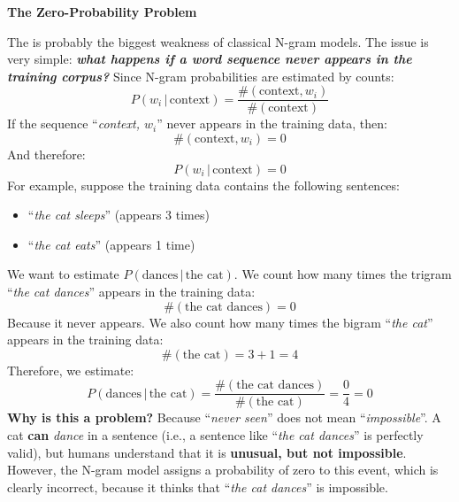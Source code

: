 \begin{flushleft}
    \textcolor{Red2}{ \textbf{The Zero-Probability Problem}}\label{def:the-zero-probability-problem}
\end{flushleft}
The  is probably the biggest weakness of classical N-gram models. The issue is very simple: \emph{\textbf{what happens if a word sequence never appears in the training corpus?}} Since N-gram probabilities are estimated by counts:
\begin{equation*}
    P\left(w_{i} \, | \, \text{context}\right) = \frac{\#\left(\text{context}, w_i\right)}{\#\left(\text{context}\right)}
\end{equation*}
If the sequence ``\emph{context, $w_i$}'' never appears in the training data, then:
\begin{equation*}
    \#\left(\text{context}, w_i\right) = 0
\end{equation*}
And therefore:
\begin{equation*}
    P\left(w_{i} \, | \, \text{context}\right) = 0
\end{equation*}
For example, suppose the training data contains the following sentences:
\begin{itemize}
    \item ``\emph{the cat sleeps}'' (appears 3 times)
    \item ``\emph{the cat eats}'' (appears 1 time)
\end{itemize}
We want to estimate $P\left(\text{dances} \, | \, \text{the cat}\right)$. We count how many times the trigram ``\emph{the cat dances}'' appears in the training data:
\begin{equation*}
    \#\left(\text{the cat dances}\right) = 0
\end{equation*}
Because it never appears. We also count how many times the bigram ``\emph{the cat}'' appears in the training data:
\begin{equation*}
    \#\left(\text{the cat}\right) = 3 + 1 = 4
\end{equation*}
Therefore, we estimate:
\begin{equation*}
    P\left(\text{dances} \, | \, \text{the cat}\right) = \frac{\#\left(\text{the cat dances}\right)}{\#\left(\text{the cat}\right)} = \frac{0}{4} = 0
\end{equation*}
\textcolor{Green3}{ \textbf{Why is this a problem?}} Because ``\emph{never seen}'' does not mean ``\emph{impossible}''. A cat \textbf{can} \emph{dance} in a sentence (i.e., a sentence like ``\emph{the cat dances}'' is perfectly valid), but humans understand that it is \textbf{unusual, but not impossible}. However, the N-gram model assigns a probability of zero to this event, which is clearly incorrect, because it thinks that ``\emph{the cat dances}'' is impossible.

